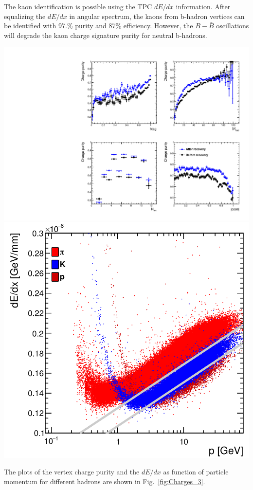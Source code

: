 The kaon identification is possible using the TPC $dE/dx$ information. After equalizing the $dE/dx$ in angular spectrum, the kaons from b-hadron vertices can be identified with 97.\% purity and 87\% efficiency. However, the $B-\bar{B}$ oscillations will degrade the kaon charge signature purity for neutral b-hadrons.
\begin{center}\vspace{1cm}
	
	\includegraphics[clip, trim=10cm 0cm 0cm 10cm,width=0.4\linewidth]{../ILD/plots/recovery-purity-comparison.pdf}\label{fig:Charges_a_3}
	\includegraphics[width=0.37\linewidth]{plots/dedx.png}\label{fig:Charges_b_3}
	\label{fig:Charges_3}
\end{center}\vspace{1cm}
The plots of the vertex charge purity and the $dE/dx$ as function of particle momentum for different hadrons are shown in Fig.~\ref{fig:Charges_3}.






